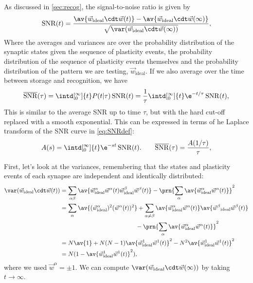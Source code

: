 \documentclass[12pt]{article}
\newcommand{\syn}{\vec{w}}
\newcommand{\synid}{\syn_\text{ideal}}
\DeclareMathOperator{\snr}{SNR}
\newcommand{\snrb}{\overline{\snr}}
\begin{document}
As discussed in \autoref{sec:recog}, the signal-to-noise ratio is given by
%
\begin{equation}\label{eq:SNRdef}
  \snr(t) = \frac{\av{\syn_\text{ideal}\cdt\syn(t)} - \av{\syn_\text{ideal}\cdt\syn(\infty)}}
     {\sqrt{\var(\syn_\text{ideal}\cdt\syn(\infty))}},
\end{equation}
%
Where the averages and variances are over the probability distribution of the synaptic states given the sequence of plasticity events, the probability distribution of the sequence of plasticity events themselves and the probability distribution of the pattern we are testing, $\synid$.
If we also average over the time between storage and recognition, we have
%
\begin{equation}\label{eq:snrb}
  \snrb(\tau) = \intd[_0^\infty]{t} P(t\vert\tau) \snr(t)
   = \frac{1}{\tau} \intd[_0^\infty]{t} \e^{-t/\tau} \snr(t),
\end{equation}
%
This is similar to the average SNR up to time $\tau$, but with the hard cut-off replaced with a smooth exponential.
This can be expressed in terms of he Laplace transform of the SNR curve in \eqref{eq:SNRdef}:
%
\begin{equation}\label{eq:laplacedef}
  A(s) = \intd[_0^\infty]{t} \e^{-st} \snr(t).
  \qquad
  \snrb(\tau) = \frac{A(1/\tau)}{\tau},
\end{equation}
%


First, let's look at the variances, remembering that the states and plasticity events of each synapse are independent and identically distributed:
%
\begin{equation}\label{eq:noise}
\begin{aligned}
  \var(\syn_\text{ideal}\cdt\syn(t))
    &= \sum_{\alpha\beta} \av{\syn^\alpha_\text{ideal}\syn^\alpha(t) \syn^\beta_\text{ideal}\syn^\beta(t)}
    - \prn{\sum_\alpha \av{\syn^\alpha_\text{ideal}\syn^\alpha(t)}}^2 \\
    &= \sum_{\alpha} \av{(\syn^\alpha_\text{ideal})^2(\syn^\alpha(t))^2}
    + \sum_{\alpha\neq\beta} \av{\syn^\alpha_\text{ideal}\syn^\alpha(t)}\av{\smash{\syn^\beta}_\text{ideal}\smash{\syn^\beta}(t)}
    \\&\phantom{= \sum_{\alpha}  \av{(\syn^\alpha_\text{ideal})^2(\syn^\alpha(t))^2}}
    - \prn{\sum_\alpha \av{\syn^\alpha_\text{ideal}\syn^\alpha(t)}}^2  \\
    &= N\av{1}
    + N(N-1)\av{\syn^1_\text{ideal}\syn^1(t)}^2
    - N^2\av{\syn^1_\text{ideal}\syn^1(t)}^2 \\
    &= N(1-\av{\syn^1_\text{ideal}\syn^1(t)}^2),
\end{aligned}
\end{equation}
%
where we used $\syn^\alpha=\pm1$.
We can compute $\var(\syn_\text{ideal}\cdt\syn(\infty))$ by taking $t\to\infty$.
\end{document}

